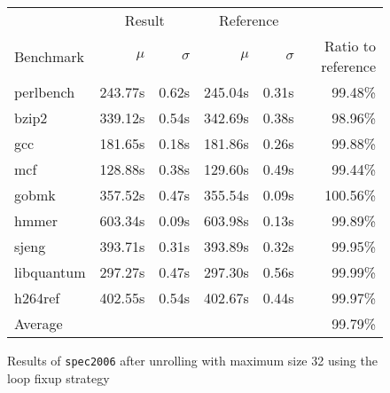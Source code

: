 \begin{figure}[h]
    \begin{center}
        \begin{tabular}{lrrrrr}
            \toprule
            & \multicolumn{2}{c}{Result} & \multicolumn{2}{c}{Reference}\\
            Benchmark & $\mu$ & $\sigma$ & $\mu$ & $\sigma$ & Ratio to reference\\
            \midrule
            perlbench & 243.77s & 0.62s & 245.04s & 0.31s & 99.48\%\\
            bzip2 & 339.12s & 0.54s & 342.69s & 0.38s & 98.96\%\\
            gcc & 181.65s & 0.18s & 181.86s & 0.26s & 99.88\%\\
            mcf & 128.88s & 0.38s & 129.60s & 0.49s & 99.44\%\\
            gobmk & 357.52s & 0.47s & 355.54s & 0.09s & 100.56\%\\
            hmmer & 603.34s & 0.09s & 603.98s & 0.13s & 99.89\%\\
            sjeng & 393.71s & 0.31s & 393.89s & 0.32s & 99.95\%\\
            libquantum & 297.27s & 0.47s & 297.30s & 0.56s & 99.99\%\\
            h264ref & 402.55s & 0.54s & 402.67s & 0.44s & 99.97\%\\
            \midrule
            Average & & & & & 99.79\%\\
            \bottomrule
        \end{tabular}
    \end{center}
    \caption{Results of \texttt{spec2006} after unrolling with maximum size 32 using the loop fixup strategy}
    \label{fig:eval:perf:loop:32}
\end{figure}
